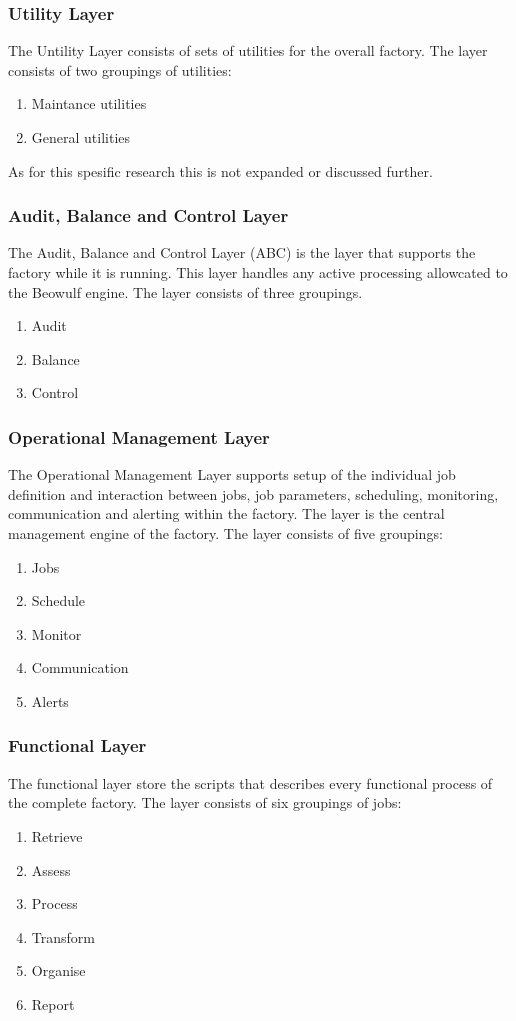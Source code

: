 \documentclass{sigplanconf}
\begin{document}
\subsubsection{Utility Layer}
The Untility Layer consists of sets of utilities for the overall factory. The layer consists of two groupings of utilities:
\begin{enumerate}
  \item Maintance utilities
  \item General utilities
\end{enumerate}
As for this spesific research this is not expanded or discussed further.
\subsubsection{Audit, Balance and Control Layer}
The Audit, Balance and Control Layer (ABC) is the layer that supports the factory while it is running.
This layer handles any active processing allowcated to the Beowulf engine.
The layer consists of three groupings.
\begin{enumerate}
  \item Audit
  \item Balance
  \item Control
\end{enumerate}
\subsubsection{Operational Management Layer}
The Operational Management Layer supports setup of the individual job definition and 
interaction between jobs, job parameters, scheduling, monitoring, communication and alerting within the factory. The layer is the central management engine of the factory. The layer consists of five groupings:
\begin{enumerate}
  \item Jobs
  \item Schedule
  \item Monitor
  \item Communication
  \item Alerts
\end{enumerate}
\subsubsection{Functional Layer}
The functional layer store the scripts that describes every functional process of the complete factory.
The layer consists of six groupings of jobs:
\begin{enumerate}
  \item Retrieve
  \item Assess
  \item Process
  \item Transform
  \item Organise
  \item Report
\end{enumerate}
\end{document}
